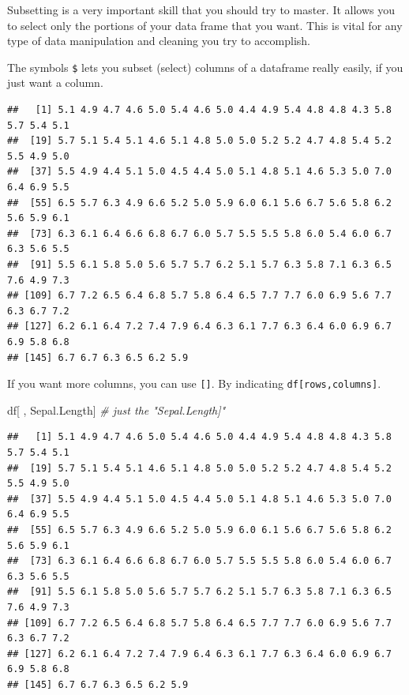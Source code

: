 \documentclass[
]{book}
\newenvironment{Shaded}{\begin{snugshade}}{\end{snugshade}}
\newcommand{\CommentTok}[1]{\textcolor[rgb]{0.56,0.35,0.01}{\textit{#1}}}
\newcommand{\NormalTok}[1]{#1}
\newcommand{\OtherTok}[1]{\textcolor[rgb]{0.56,0.35,0.01}{#1}}
\newcommand{\SpecialCharTok}[1]{\textcolor[rgb]{0.00,0.00,0.00}{#1}}
\newcommand{\StringTok}[1]{\textcolor[rgb]{0.31,0.60,0.02}{#1}}
\begin{document}
Subsetting is a very important skill that you should try to master.
It allows you to select only the portions of your data frame that you want.
This is vital for any type of data manipulation and cleaning you try to accomplish.

The symbols \texttt{\$} lets you subset (select) columns of a dataframe really easily, if you just want a column.

\begin{Shaded}
\end{Shaded}

\begin{verbatim}
##   [1] 5.1 4.9 4.7 4.6 5.0 5.4 4.6 5.0 4.4 4.9 5.4 4.8 4.8 4.3 5.8 5.7 5.4 5.1
##  [19] 5.7 5.1 5.4 5.1 4.6 5.1 4.8 5.0 5.0 5.2 5.2 4.7 4.8 5.4 5.2 5.5 4.9 5.0
##  [37] 5.5 4.9 4.4 5.1 5.0 4.5 4.4 5.0 5.1 4.8 5.1 4.6 5.3 5.0 7.0 6.4 6.9 5.5
##  [55] 6.5 5.7 6.3 4.9 6.6 5.2 5.0 5.9 6.0 6.1 5.6 6.7 5.6 5.8 6.2 5.6 5.9 6.1
##  [73] 6.3 6.1 6.4 6.6 6.8 6.7 6.0 5.7 5.5 5.5 5.8 6.0 5.4 6.0 6.7 6.3 5.6 5.5
##  [91] 5.5 6.1 5.8 5.0 5.6 5.7 5.7 6.2 5.1 5.7 6.3 5.8 7.1 6.3 6.5 7.6 4.9 7.3
## [109] 6.7 7.2 6.5 6.4 6.8 5.7 5.8 6.4 6.5 7.7 7.7 6.0 6.9 5.6 7.7 6.3 6.7 7.2
## [127] 6.2 6.1 6.4 7.2 7.4 7.9 6.4 6.3 6.1 7.7 6.3 6.4 6.0 6.9 6.7 6.9 5.8 6.8
## [145] 6.7 6.7 6.3 6.5 6.2 5.9
\end{verbatim}

If you want more columns, you can use \texttt{{[}{]}}.
By indicating \texttt{df{[}rows,columns{]}}.

\begin{Shaded}
\begin{Highlighting}[]
\NormalTok{df[ , }\StringTok{\textquotesingle{}Sepal.Length\textquotesingle{}}\NormalTok{]  }\CommentTok{\# just the "Sepal.Length]"}
\end{Highlighting}
\end{Shaded}

\begin{verbatim}
##   [1] 5.1 4.9 4.7 4.6 5.0 5.4 4.6 5.0 4.4 4.9 5.4 4.8 4.8 4.3 5.8 5.7 5.4 5.1
##  [19] 5.7 5.1 5.4 5.1 4.6 5.1 4.8 5.0 5.0 5.2 5.2 4.7 4.8 5.4 5.2 5.5 4.9 5.0
##  [37] 5.5 4.9 4.4 5.1 5.0 4.5 4.4 5.0 5.1 4.8 5.1 4.6 5.3 5.0 7.0 6.4 6.9 5.5
##  [55] 6.5 5.7 6.3 4.9 6.6 5.2 5.0 5.9 6.0 6.1 5.6 6.7 5.6 5.8 6.2 5.6 5.9 6.1
##  [73] 6.3 6.1 6.4 6.6 6.8 6.7 6.0 5.7 5.5 5.5 5.8 6.0 5.4 6.0 6.7 6.3 5.6 5.5
##  [91] 5.5 6.1 5.8 5.0 5.6 5.7 5.7 6.2 5.1 5.7 6.3 5.8 7.1 6.3 6.5 7.6 4.9 7.3
## [109] 6.7 7.2 6.5 6.4 6.8 5.7 5.8 6.4 6.5 7.7 7.7 6.0 6.9 5.6 7.7 6.3 6.7 7.2
## [127] 6.2 6.1 6.4 7.2 7.4 7.9 6.4 6.3 6.1 7.7 6.3 6.4 6.0 6.9 6.7 6.9 5.8 6.8
## [145] 6.7 6.7 6.3 6.5 6.2 5.9
\end{verbatim}
\end{document}
